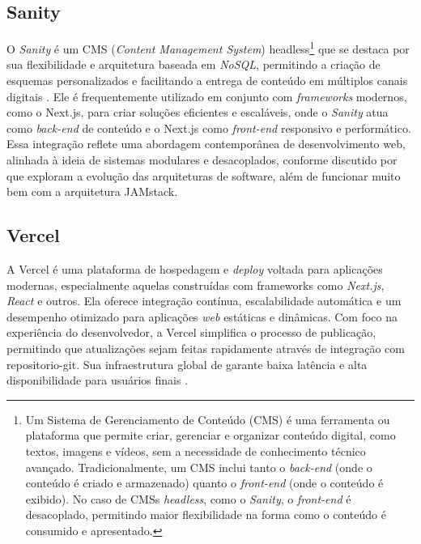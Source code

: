 {%


\subsection{Sanity}
O \textit{Sanity} é um CMS (\textit{Content Management System}) headless\footnote{ Um Sistema de Gerenciamento de Conteúdo (CMS) é uma ferramenta ou plataforma que permite criar, gerenciar e organizar conteúdo digital, como textos, imagens e vídeos, sem a necessidade de conhecimento técnico avançado. Tradicionalmente, um CMS inclui tanto o \textit{back-end} (onde o conteúdo é criado e armazenado) quanto o \textit{front-end} (onde o conteúdo é exibido). No caso de CMSs \textit{headless}, como o \textit{Sanity}, o \textit{front-end} é desacoplado, permitindo maior flexibilidade na forma como o conteúdo é consumido e apresentado.} que se destaca por sua flexibilidade e arquitetura baseada em \textit{NoSQL}, permitindo a criação de esquemas personalizados e facilitando a entrega de conteúdo em múltiplos canais digitais \citep{sanity_official}. Ele é frequentemente utilizado em conjunto com \textit{frameworks} modernos, como o Next.js, para criar soluções eficientes e escaláveis, onde o \textit{Sanity} atua como \textit{back-end} de conteúdo e o Next.js como \textit{front-end} responsivo e performático. Essa integração reflete uma abordagem contemporânea de desenvolvimento web, alinhada à ideia de sistemas modulares e desacoplados, conforme discutido por \cite{gamma2000padrões} que exploram a evolução das arquiteturas de software, além de funcionar muito bem com a arquitetura JAMstack. 


\subsection{Vercel}
A Vercel é uma plataforma de hospedagem e \textit{deploy} voltada para aplicações modernas, especialmente aquelas construídas com frameworks como \textit{Next.js}, \textit{React} e outros. Ela oferece integração contínua, escalabilidade automática e um desempenho otimizado para aplicações \textit{web} estáticas e dinâmicas. Com foco na experiência do desenvolvedor, a Vercel simplifica o processo de publicação, permitindo que atualizações sejam feitas rapidamente através de integração com \gls{repositorio-git}. Sua infraestrutura global de  garante baixa latência e alta disponibilidade para usuários finais \citep{vercel}.

}
